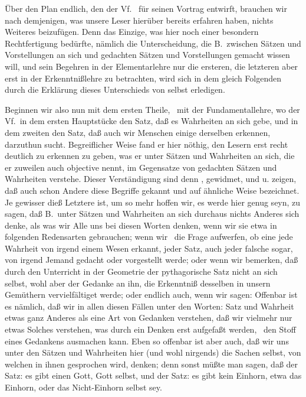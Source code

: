 Über den Plan endlich, den der Vf.\  für seinen Vortrag entwirft, brauchen wir nach demjenigen, was unsere Leser hierüber bereits erfahren haben, nichts Weiteres beizufügen. Denn das Einzige, was hier noch einer besondern Rechtfertigung bedürfte, nämlich die Unterscheidung, die B.\ zwischen Sätzen und Vorstellungen an sich und gedachten Sätzen und Vorstellungen gemacht wissen will, und sein Begehren in der Elementarlehre nur die ersteren, die letzteren aber erst in der Erkenntnißlehre zu betrachten, wird sich in dem gleich Folgenden durch die Erklärung dieses Unterschieds von selbst erledigen. \par
Beginnen wir also nun mit dem ersten Theile, \dh\  mit der Fundamentallehre, wo der Vf.\ in dem ersten Hauptstücke den Satz, daß es Wahrheiten an sich gebe, und in dem zweiten den Satz, daß auch wir Menschen einige derselben erkennen, darzuthun sucht. Begreiflicher Weise fand er hier nöthig, den Lesern erst recht deutlich zu erkennen zu geben, was er unter Sätzen und Wahrheiten an sich, die er zuweilen auch objective nennt, im Gegensatze von gedachten Sätzen und Wahrheiten verstehe. Dieser Verständigung sind denn ,  gewidmet, und  u.  zeigen, daß auch schon Andere diese Begriffe gekannt und auf ähnliche Weise bezeichnet. Je gewisser dieß Letztere ist, um so mehr hoffen wir, es werde hier genug seyn, zu sagen, daß B.\ unter Sätzen und Wahrheiten an sich durchaus nichts Anderes sich denke, als was wir Alle uns bei diesen Worten denken, wenn wir sie etwa in folgenden Redensarten gebrauchen; wenn wir \zB\ die Frage aufwerfen, ob eine jede Wahrheit von irgend einem Wesen erkannt, jeder Satz, auch jeder falsche sogar, von irgend Jemand gedacht oder vorgestellt werde; oder wenn wir bemerken, daß durch den Unterricht in der Geometrie der pythagorische Satz nicht an sich selbst, wohl aber der Gedanke an ihn, die Erkenntniß desselben in unsern Gemüthern vervielfältiget werde; oder endlich auch, wenn wir sagen:  Offenbar ist es nämlich, daß wir in allen diesen Fällen unter den Worten: Satz und Wahrheit etwas ganz Anderes als eine Art von Gedanken verstehen, daß wir vielmehr nur etwas Solches verstehen, was durch ein Denken erst aufgefaßt werden, \dh\  den Stoff eines Gedankens ausmachen kann. Eben so offenbar ist aber auch, daß wir uns unter den Sätzen und Wahrheiten hier (und wohl nirgends) die Sachen selbst, von welchen in ihnen gesprochen wird, denken; denn sonst müßte man sagen, daß der Satz: es gibt einen Gott, Gott selbst, und der Satz: es gibt kein Einhorn, etwa das Einhorn, oder das Nicht-Einhorn selbst sey. \par
